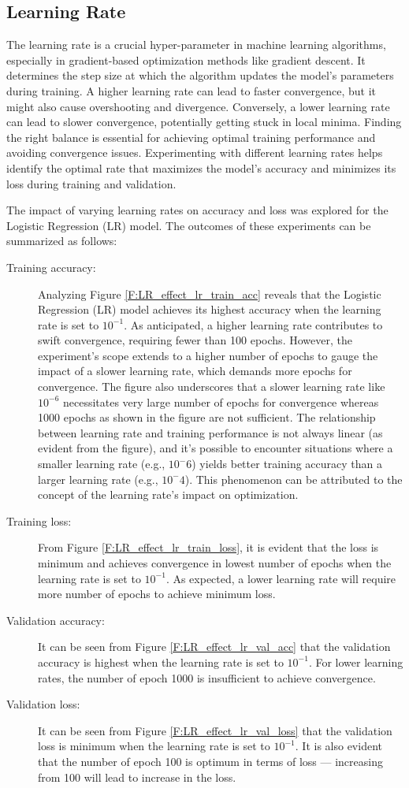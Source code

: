\documentclass[12pt, a4paper, twoside]{article}
\begin{document}
\subsection{Learning Rate}\label{SS:lr-rate}
The learning rate is a crucial hyper-parameter in machine learning algorithms, especially in gradient-based optimization methods like gradient descent. It determines the step size at which the algorithm updates the model's parameters during training. A higher learning rate can lead to faster convergence, but it might also cause overshooting and divergence. Conversely, a lower learning rate can lead to slower convergence, potentially getting stuck in local minima. Finding the right balance is essential for achieving optimal training performance and avoiding convergence issues. Experimenting with different learning rates helps identify the optimal rate that maximizes the model's accuracy and minimizes its loss during training and validation.
\par
The impact of varying learning rates on accuracy and loss was explored for the Logistic Regression (LR) model. The outcomes of these experiments can be summarized as follows:
\begin{description}
\item[Training accuracy:] Analyzing Figure \ref{F:LR_effect_lr_train_acc} reveals that the Logistic Regression (LR) model achieves its highest accuracy when the learning rate is set to $10^{-1}$. As anticipated, a higher learning rate contributes to swift convergence, requiring fewer than 100 epochs. However, the experiment's scope extends to a higher number of epochs to gauge the impact of a slower learning rate, which demands more epochs for convergence. The figure also underscores that a slower learning rate like $10^{-6}$ necessitates very large number of epochs for convergence whereas 1000 epochs as shown in the figure are not sufficient.  The relationship between learning rate and training performance is not always linear (as evident from the figure), and it's possible to encounter situations where a smaller learning rate (e.g., $10^-6$) yields better training accuracy than a larger learning rate (e.g., $10^-4$). This phenomenon can be attributed to the concept of the learning rate's impact on optimization.
\item[Training loss:] From Figure \ref{F:LR_effect_lr_train_loss}, it is evident that the loss is minimum and achieves convergence in lowest number of epochs when the learning rate is set to $10^{-1}$. As expected, a lower learning rate will require more number of epochs to achieve minimum loss.
\item[Validation accuracy:] It can be seen from Figure \ref{F:LR_effect_lr_val_acc} that the validation accuracy is highest when the learning rate is set to $10^{-1}$.  For lower learning rates, the number of epoch 1000 is insufficient to achieve convergence.
\item[Validation loss:] It can be seen from Figure \ref{F:LR_effect_lr_val_loss} that the validation loss is minimum when the learning rate is set to $10^{-1}$. It is also evident that the number of epoch 100 is optimum in terms of loss --- increasing from 100 will lead to increase in the loss.
\end{description}
\end{document}
